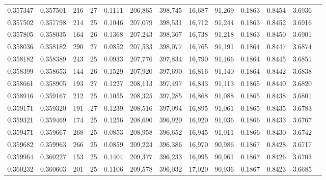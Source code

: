 \begin{tabular}{rrrrrrrrrrrrr}
0.357347 & 0.357501 &   216 &  27 &                                     0.1111 & 206,865 & 398,745 &  16,687 &  91,269 & 0.1863 & 0.8454 & 3.6936 \\
0.357502 & 0.357798 &   214 &  25 &                                     0.1046 & 207,079 & 398,531 &  16,712 &  91,244 & 0.1863 & 0.8452 & 3.6916 \\
0.357805 & 0.358035 &   164 &  26 &                                     0.1368 & 207,243 & 398,367 &  16,738 &  91,218 & 0.1863 & 0.8450 & 3.6901 \\
0.358036 & 0.358182 &   290 &  27 &                                     0.0852 & 207,533 & 398,077 &  16,765 &  91,191 & 0.1864 & 0.8447 & 3.6874 \\
0.358182 & 0.358389 &   243 &  25 &                                     0.0933 & 207,776 & 397,834 &  16,790 &  91,166 & 0.1864 & 0.8445 & 3.6851 \\
0.358399 & 0.358653 &   144 &  26 &                                     0.1529 & 207,920 & 397,690 &  16,816 &  91,140 & 0.1864 & 0.8442 & 3.6838 \\
0.358661 & 0.358905 &   193 &  27 &                                     0.1227 & 208,113 & 397,497 &  16,843 &  91,113 & 0.1865 & 0.8440 & 3.6820 \\
0.358916 & 0.359167 &   212 &  25 &                                     0.1055 & 208,325 & 397,285 &  16,868 &  91,088 & 0.1865 & 0.8438 & 3.6801 \\
0.359171 & 0.359320 &   191 &  27 &                                     0.1239 & 208,516 & 397,094 &  16,895 &  91,061 & 0.1865 & 0.8435 & 3.6783 \\
0.359321 & 0.359469 &   174 &  25 &                                     0.1256 & 208,690 & 396,920 &  16,920 &  91,036 & 0.1866 & 0.8433 & 3.6767 \\
0.359471 & 0.359667 &   268 &  25 &                                     0.0853 & 208,958 & 396,652 &  16,945 &  91,011 & 0.1866 & 0.8430 & 3.6742 \\
0.359682 & 0.359963 &   266 &  25 &                                     0.0859 & 209,224 & 396,386 &  16,970 &  90,986 & 0.1867 & 0.8428 & 3.6717 \\
0.359964 & 0.360227 &   153 &  25 &                                     0.1404 & 209,377 & 396,233 &  16,995 &  90,961 & 0.1867 & 0.8426 & 3.6703 \\
0.360232 & 0.360603 &   201 &  25 &                                     0.1106 & 209,578 & 396,032 &  17,020 &  90,936 & 0.1867 & 0.8423 & 3.6685 \\

\end{tabular}
